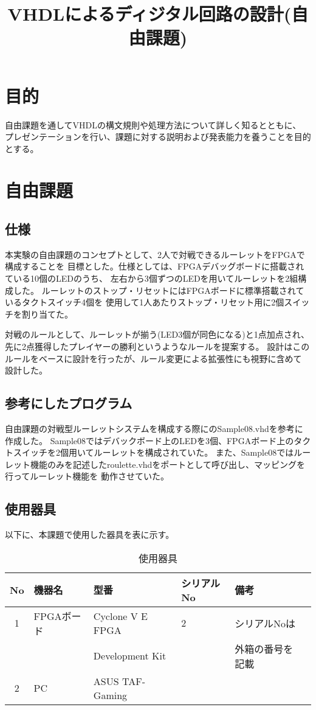 \documentclass{ltjsarticle}
\title{VHDLによるディジタル回路の設計(自由課題)}
\begin{document}
\maketitle

\section{目的}
	自由課題を通してVHDLの構文規則や処理方法について詳しく知るとともに、
	プレゼンテーションを行い、課題に対する説明および発表能力を養うことを目的とする。
\section{自由課題}
	\subsection{仕様}
		本実験の自由課題のコンセプトとして、2人で対戦できるルーレットをFPGAで構成することを
		目標とした。仕様としては、FPGAデバッグボードに搭載されている10個のLEDのうち、
		左右から3個ずつのLEDを用いてルーレットを2組構成した。
		ルーレットのストップ・リセットにはFPGAボードに標準搭載されているタクトスイッチ4個を
		使用して1人あたりストップ・リセット用に2個スイッチを割り当てた。

		対戦のルールとして、ルーレットが揃う(LED3個が同色になる)と1点加点され、
		先に2点獲得したプレイヤーの勝利というようなルールを提案する。
		設計はこのルールをベースに設計を行ったが、ルール変更による拡張性にも視野に含めて
		設計した。
	\subsection{参考にしたプログラム}
		自由課題の対戦型ルーレットシステムを構成する際に\cite{ref:指導書}のSample08.vhdを参考に作成した。
		Sample08ではデバックボード上のLEDを3個、FPGAボード上のタクトスイッチを2個用いてルーレットを構成されていた。
		また、Sample08ではルーレット機能のみを記述したroulette.vhdをポートとして呼び出し、マッピングを行ってルーレット機能を
		動作させていた。

	\subsection{使用器具}
		以下に、本課題で使用した器具を表に示す。
	\begin{table}[H]
	\begin{center}
	\caption{使用器具}
	\label{tab:used}
	\begin{tabular}{clllll} \toprule
	No&\multicolumn{1}{l}{機器名}&\multicolumn{1}{l}{型番}&\multicolumn{1}{l}{シリアルNo}&\multicolumn{1}{l}{備考}\\ \hline
	1&FPGAボード&Cyclone V E FPGA&2&シリアルNoは\\
	&&Development Kit&&外箱の番号を記載\\
	2&PC&ASUS TAF-Gaming&&\\
	\bottomrule
	\end{tabular}
	\end{center}
	\end{table}
\end{document}
